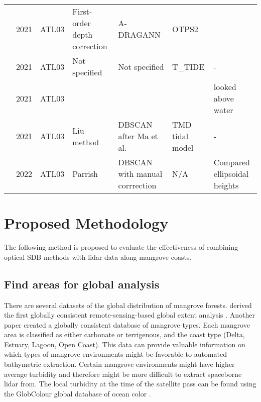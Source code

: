 \begin{landscape}
\begin{table}
\begin{tabular}{p{3.7cm}llp{3.2cm}p{3.5cm}ll}
                  \citeauthor{Cao2021}               & 2021 & ATL03   & First-order depth correction  & A-DRAGANN                      & OTPS2           &                              \\
                  \citeauthor{Lee2021}               & 2021 & ATL03   & Not specified                 & Not specified                  & T\_TIDE         & -                            \\
                  \citeauthor{Xu2022a}               & 2021 & ATL03   &                               &                                &                 & looked above water           \\
                  \citeauthor{Liu2021}               & 2021 & ATL03   & Liu method                    & DBSCAN after Ma et al.         & TMD tidal model & -                            \\
                  \citeauthor{LeQuilleuc2022b}       & 2022 & ATL03   & Parrish                       & DBSCAN with manual corrrection & N/A             & Compared ellipsoidal heights \\
                  \bottomrule
            \end{tabular}
      \end{table}

\end{landscape}
\restoregeometry

\chapter{Proposed Methodology}
The following method is proposed to evaluate the effectiveness of combining optical SDB methods with lidar data along mangrove coasts.

\section{Find areas for global analysis}
There are several datasets of the global distribution of mangrove forests. \citeauthor{Giri2011b} derived the first globally consistent remote-sensing-based global extent analysis \parencite{Worthington2020}. Another paper \parencite{Worthington2020a} created a globally consistent database of mangrove types. Each mangrove area is classified as either carbonate or terrigenous, and the coast type (Delta, Estuary, Lagoon, Open Coast). This data can provide valuable information on which types of mangrove environments might be favorable to automated bathymetric extraction. Certain mangrove environments might have higher average turbidity and therefore might be more difficult to extract spaceborne lidar from. The local turbidity at the time of the satellite pass can be found using the GlobColour global database of ocean color \parencite{Garnesson2019}.

